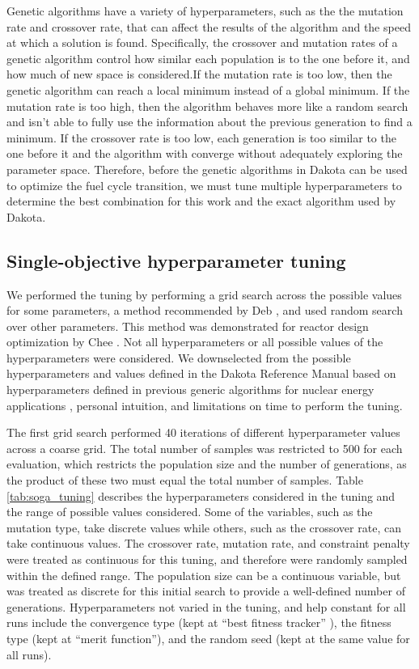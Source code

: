 Genetic algorithms have a variety of hyperparameters, such as the the 
mutation rate and crossover rate, that can affect 
the results of the algorithm and the speed at which a solution is found. 
Specifically, the crossover and mutation rates of a genetic algorithm 
control how similar each population is to the one before it, and how much 
of new space is considered.If the mutation rate is too low, then the 
genetic algorithm can reach a local minimum instead of a global 
minimum. If the mutation rate is too high, then the algorithm behaves more 
like a random search and isn't able to fully use the information about the 
previous generation to find a minimum. If the crossover rate is too low, 
each generation is too similar to the one before it and the algorithm 
with converge without adequately exploring the parameter space. 
Therefore, before the genetic algorithms in Dakota can be used to 
optimize the fuel cycle transition, we must tune multiple hyperparameters
to determine the best combination for this work and the exact algorithm 
used by Dakota.

\subsection{Single-objective hyperparameter tuning}
We performed the tuning by performing a grid search across 
the possible values for some parameters, a method recommended 
by Deb \cite{deb_multi-objective_2001}, and used random 
search over other parameters. This method was demonstrated for reactor 
design optimization by Chee \cite{chee_fluoride-salt-cooled_2022}. 
Not all hyperparameters or all possible values of the hyperparameters 
were considered. We downselected from 
the possible hyperparameters and values defined in the Dakota Reference 
Manual based on hyperparameters defined in previous generic algorithms 
for nuclear energy applications
\cite{passerini_systematic_2014,chee_fluoride-salt-cooled_2022},
personal intuition, and limitations on time to perform 
the tuning.

The 
first grid search performed 40 iterations of different hyperparameter 
values across a coarse grid. The total number of samples was restricted to 
500 for each evaluation, which restricts the population size and the 
number of generations, as the product of these two must equal the 
total number of samples. Table \ref{tab:soga_tuning} describes 
the hyperparameters considered in the tuning and the range of possible 
values considered. Some of the variables, such as the mutation 
type, take discrete values while others, such as the crossover 
rate, can take continuous values. The crossover rate, mutation 
rate, and constraint penalty were treated as continuous for this 
tuning, and therefore were randomly sampled within the defined range. 
The population size can be a continuous variable, but was 
treated as discrete for this initial search to provide a well-defined 
number of generations. Hyperparameters not varied in the tuning, and 
help constant for all runs include the convergence type (kept at
``best fitness tracker'' ), the fitness type (kept at ``merit function''),
and the random seed (kept at the same value for all runs).

